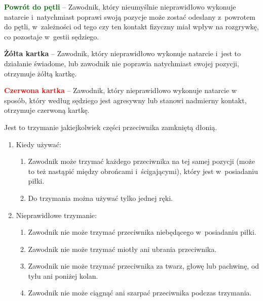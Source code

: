 \documentclass[12pt,a4paper]{article}
\renewcommand{\paragraph}[1]{
  \oldparagraph{#1}%
  \leftskip2cm
}
\newcommand\redcard[1]{\bgroup\textcolor{red}{\textbf{#1}}}
\newcommand\yellowcard[1]{\bgroup\textcolor{darkyellow}{\textbf{#1}}}
\newcommand\other[1]{\bgroup\textcolor{darkgreen}{\textbf{#1}}}
\begin{document}
\other{Powrót do pętli} -- Zawodnik, który nieumyślnie nieprawidłowo
wykonuje natarcie i~natychmiast poprawi swoją pozycje może zostać
odesłany z~powrotem do pętli, w~zależności od tego czy ten kontakt
fizyczny miał wpływ na rozgrywkę, co pozostaje w~gestii sędziego.

\yellowcard{Żółta kartka} -- Zawodnik, który nieprawidłowo wykonuje natarcie i~jest to działanie świadome, lub zawodnik nie poprawia natychmiast swojej
pozycji, otrzymuje żółtą kartkę.

\redcard{Czerwona kartka} -- Zawodnik, który nieprawidłowo wykonuje natarcie
w sposób, który według sędziego jest agresywny lub stanowi nadmierny
kontakt, otrzymuje czerwoną kartkę.

\paragraph{Trzymanie}
Jest to trzymanie jakiejkolwiek części
przeciwnika zamkniętą dłonią.

\begin{enumerate}
	\item
	      Kiedy używać:

	      \begin{enumerate}
		      \item Zawodnik może trzymać każdego przeciwnika na tej samej pozycji
		            (może to też nastąpić między obrońcami i~ścigającymi), który jest w~posiadaniu piłki.
		      \item
		            Do trzymania można używać tylko jednej ręki.
	      \end{enumerate}
	\item
	      Nieprawidłowe trzymanie:

	      \begin{enumerate}
		      \item
		            Zawodnik nie może trzymać przeciwnika niebędącego w~posiadaniu
		            piłki.
		      \item
		            Zawodnik nie może trzymać miotły ani ubrania przeciwnika.
		      \item
		            Zawodnik nie może trzymać przeciwnika za twarz, głowę lub pachwinę,
		            od tyłu ani poniżej kolan.
		      \item Zawodnik nie może ciągnąć ani szarpać przeciwnika podczas
		            trzymania.
	      \end{enumerate}
\end{enumerate}
\end{document}
